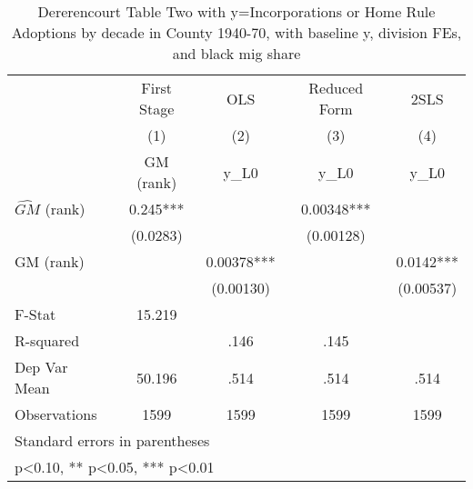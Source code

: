 \begin{table}[htbp]\centering
\def\sym#1{\ifmmode^{#1}\else\(^{#1}\)\fi}
\caption{Dererencourt Table Two with y=Incorporations or Home Rule Adoptions by decade in County 1940-70, with baseline y, division FEs, and black mig share}
\begin{tabular}{l*{4}{c}}
\toprule
                    & First Stage   &         OLS   &Reduced Form   &        2SLS   \\
                    &\multicolumn{1}{c}{(1)}&\multicolumn{1}{c}{(2)}&\multicolumn{1}{c}{(3)}&\multicolumn{1}{c}{(4)}\\
                    &\multicolumn{1}{c}{GM  (rank)}&\multicolumn{1}{c}{y\_L0}&\multicolumn{1}{c}{y\_L0}&\multicolumn{1}{c}{y\_L0}\\
\midrule
$\hat{GM}$ (rank)   &       0.245***&               &     0.00348***&               \\
                    &    (0.0283)   &               &   (0.00128)   &               \\
\addlinespace
GM  (rank)          &               &     0.00378***&               &      0.0142***\\
                    &               &   (0.00130)   &               &   (0.00537)   \\
\midrule
F-Stat              &      15.219   &               &               &               \\
R-squared           &               &        .146   &        .145   &               \\
Dep Var Mean        &      50.196   &        .514   &        .514   &        .514   \\
Observations        &        1599   &        1599   &        1599   &        1599   \\
\bottomrule
\multicolumn{5}{l}{\footnotesize Standard errors in parentheses}\\
\multicolumn{5}{l}{\footnotesize * p<0.10, ** p<0.05, *** p<0.01}\\
\end{tabular}
\end{table}
